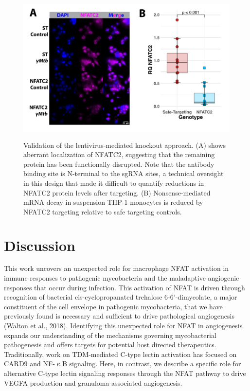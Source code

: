 \begin{figure}
\centering
\includegraphics[height=3in]{images/lentivalid.pdf}
\caption{Validation of the lentivirus-mediated knockout approach. (A) shows aberrant localization of NFATC2, suggesting that the remaining protein has been functionally disrupted. Note that the antibody binding site is N-terminal to the sgRNA sites, a technical oversight in this design that made it difficult to quantify reductions in NFATC2 protein levels after targeting. (B) Nonsense-mediated mRNA decay in suspension THP-1 monocytes is reduced by NFATC2 targeting relative to safe targeting controls.}
\label{figure:validation}
\end{figure}

\section{Discussion}\label{pap:disc}

This work uncovers an unexpected role for macrophage NFAT activation in immune responses to pathogenic mycobacteria and the maladaptive angiogenic responses that occur during infection. This activation of NFAT is driven through recognition of bacterial cis\hyp{}cyclopropanated trehalose 6\hyp{}6'\hyp{}dimycolate, a major constituent of the cell envelope in pathogenic mycobacteria, that we have previously found is necessary and sufficient to drive pathological angiogenesis (Walton et al., 2018). Identifying this unexpected role for NFAT in angiogenesis expands our understanding of the mechanisms governing mycobacterial pathogenesis and offers targets for potential host directed therapeutics. Traditionally, work on TDM-mediated C-type lectin activation has focused on CARD9 and NF-$\upkappa$B signaling. Here, in contrast, we describe a specific role for alternative C-type lectin signaling responses through the NFAT pathway to drive VEGFA production and granuloma-associated angiogenesis. 

